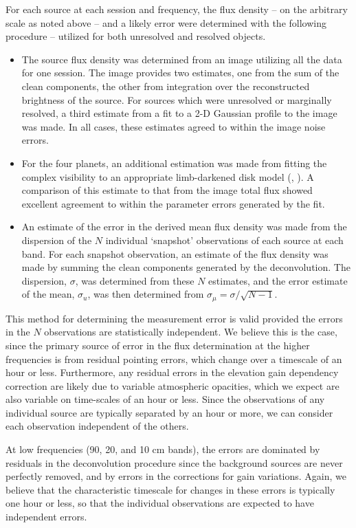 \documentclass{aastex}
\begin{document}
For each source at each session and frequency, the flux density -- on
the arbitrary scale as noted above -- and a likely error were
determined with the following procedure -- utilized for both
unresolved and resolved objects.
\begin{itemize}
\item The source flux density was determined from an image utilizing
  all the data for one session.  The image provides two estimates, one
  from the sum of the clean components, the other from integration
  over the reconstructed brightness of the source.  For sources which
  were unresolved or marginally resolved, a third estimate from
  a fit to a 2-D Gaussian profile to the image was made.  In all
  cases, these estimates agreed to within the image noise errors.
\item For the four planets, an additional estimation was made from
  fitting the complex visibility to an appropriate limb-darkened disk
  model (\citet{But99}, \citet{But01}).  A comparison of this
  estimate to that from the image total flux showed excellent
  agreement to within the parameter errors generated by the fit.
\item An estimate of the error in the derived mean flux density was
  made from the dispersion of the $N$ individual `snapshot'
  observations of each source at each band.  For each snapshot
  observation, an estimate of the flux density was made by summing the
  clean components generated by the deconvolution.  The dispersion,
  $\sigma$, was determined from these $N$ estimates, and the error
  estimate of the mean, $\sigma_{u}$, was then determined from
  $\sigma_\mu = \sigma/\sqrt{N-1}$.
\end{itemize}

This method for determining the measurement error is valid provided
the errors in the $N$ observations are statistically independent.  We
believe this is the case, since the primary source of error in the
flux determination at the higher frequencies is from residual pointing
errors, which change over a timescale of an hour or less.
Furthermore, any residual errors in the elevation gain dependency
correction are likely due to variable atmospheric opacities, which we
expect are also variable on time-scales of an hour or less.  Since the
observations of any individual source are typically separated by an
hour or more, we can consider each observation independent of the
others.

At low frequencies (90, 20, and 10 cm bands), the errors are dominated
by residuals in the deconvolution procedure since the background
sources are never perfectly removed, and by errors in the corrections
for gain variations.  Again, we believe that the characteristic
timescale for changes in these errors is typically one hour or less,
so that the individual observations are expected to have
independent errors.
\end{document}
